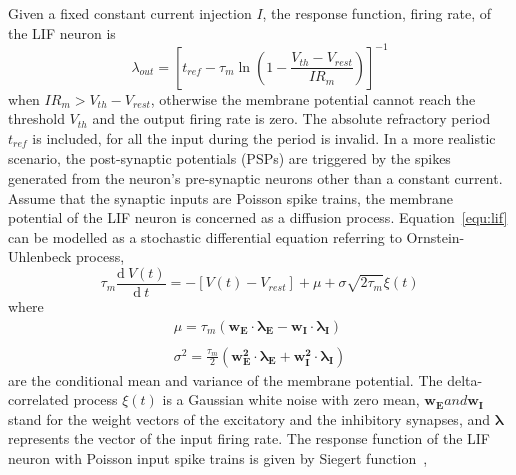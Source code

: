 \documentclass[journal]{journal}
\def\D{\mathrm{d}}
\begin{document}
Given a fixed constant current injection $I$, the response function, firing rate, of the LIF neuron is
\begin{equation}
\lambda_\mathit{out}=
\left [ t_\mathit{ref}-\tau_m\ln \left ( 1-\frac{V_{th}-V_\mathit{rest}}{IR_m}  \right )\right ]^{-1}
\label{equ:consI}
\end{equation}
when $IR_m>V_{th}-V_{rest}$, otherwise the membrane potential cannot reach the threshold $V_{th}$ and the output firing rate is zero. 
The absolute refractory period $t_\mathit{ref}$ is included, for all the input during the period is invalid.
In a more realistic scenario, the post-synaptic potentials (PSPs) are triggered by the spikes generated from the neuron's pre-synaptic neurons other than a constant current.
Assume that the synaptic inputs are Poisson spike trains, the membrane potential of the LIF neuron is concerned as a diffusion process. Equation~\ref{equ:lif} can be modelled as a stochastic differential equation referring to Ornstein-Uhlenbeck process,
\begin{equation}
\tau_m\frac{\D\:V(t)}{\D\:  t}=-\left[V(t)-V_\mathit{rest}\right] + \mu + \sigma\sqrt{2\tau_m}\xi (t)
\label{equ:sde}
\end{equation}
where
\begin{equation}
\begin{array}{l}
\mu=\tau_m(\mathbf{w_E\cdot\lambda_E}-\mathbf{w_I\cdot\lambda_I})
\\
\\
\sigma ^{2} = \frac{\tau_m}{2}\left(\mathbf{w_E^{2}\cdot\lambda_E}+\mathbf{w_I^{2}\cdot\lambda_I}\right)
\end{array}
\label{equ:ou}
\end{equation}
are the conditional mean and variance of the membrane potential.
The delta-correlated process $\xi(t)$ is a Gaussian white noise with zero mean, $\mathbf{w_E} and \mathbf{w_I}$ stand for the weight vectors of the excitatory and the inhibitory synapses, and $\mathbf{\lambda}$ represents the vector of the input firing rate.
The response function of the LIF neuron with Poisson input spike trains is given by Siegert function~\cite{siegert1951first}, 
\end{document}

